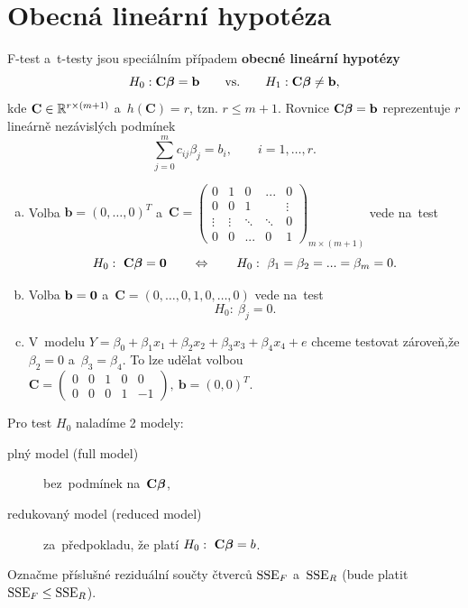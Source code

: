 \section{Obecná lineární hypotéza}
F-test a~t-testy jsou speciálním případem \textbf{obecné lineární hypotézy}
 $$ H_0: \textbf{C}\boldsymbol{\beta} = \textbf{b} \qquad\text{vs.}\qquad H_1: \textbf{C}\boldsymbol{\beta}\neq\textbf{b}, $$
kde $\textbf{C}\in\mathbb{R}^{r\times(m+1)}$ a~$h(\textbf{C}) = r$, tzn. $r\leq m+1$. Rovnice $\textbf{C}\boldsymbol{\beta} = \textbf{b}$ reprezentuje $r$ lineárně nezávislých podmínek
 $$ \sum_{j = 0}^m c_{ij}\beta_j = b_i,\qquad i = 1,\dots,r. $$
\begin{remark}
	\begin{enumerate}[a)]
		\item Volba $\textbf{b} = (0,\dots,0)^T$ a~$ \textbf{C} = \left(\begin{array}{c|cccc}
		0 & 1 & 0 &... & 0 \\\hline
		0 & 0 & 1 &  & \vdots \\
		\vdots& \vdots & \ddots & \ddots & 0 \\
		0 & 0 &... & 0 & 1
		\end{array}
		\right)_{m\times(m+1)} $ vede na~test
		 $$ H_0:~\textbf{C}\boldsymbol{\beta} = \boldsymbol{0}\qquad\Leftrightarrow\qquad H_0:~\beta_1 = \beta_2 = ... = \beta_m = 0. $$
		\item Volba $\textbf{b} = \boldsymbol{0}$ a~$\textbf{C} = (0,\dots,0,1,0,\dots,0)$ vede na~test
		 $$ H_0:~\beta_j = 0. $$
		\item V~modelu $Y = \beta_0+\beta_1x_1+\beta_2x_2+\beta_3x_3+\beta_4x_4+e$ chceme testovat zároveň,že $\beta_2 = 0$ a~$\beta_3 = \beta_4$. To lze udělat volbou $ \textbf{C} = \left(\begin{array}{ccccc}
		0 & 0 & 1 & 0 & 0 \\
		0 & 0 & 0 & 1 & -1
		\end{array}
		 \right),~\textbf{b} = (0,0)^T $.
	\end{enumerate}
\end{remark}

Pro test $H_0$ naladíme 2 modely:\begin{description}
\item[plný model (full model)] bez~podmínek na~$\textbf{C}\boldsymbol{\beta}$,
\item[redukovaný model (reduced model)] za~předpokladu, že platí $H_0:~\textbf{C}\boldsymbol{\beta} = b$.
\end{description}

Označme příslušné reziduální součty čtverců $\mathrm{SSE}_F$ a~$\mathrm{SSE}_R$ (bude platit $\mathrm{SSE}_F\leq\mathrm{SSE}_R$).

